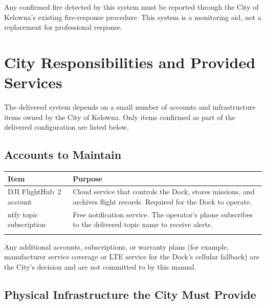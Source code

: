 \documentclass[11pt,letterpaper]{article}
\begin{document}
\begin{infobox}
Any confirmed fire detected by this system must be reported through the
City of Kelowna's existing fire-response procedure. This system is a
monitoring aid, not a replacement for professional response.
\end{infobox}

\newpage


\section{City Responsibilities and Provided Services}

The delivered system depends on a small number of accounts and
infrastructure items owned by the City of Kelowna. Only items confirmed
as part of the delivered configuration are listed below.

\subsection{Accounts to Maintain}

\begin{longtable}{@{}p{4.0cm}p{11.0cm}@{}}
\toprule
\textbf{Item} & \textbf{Purpose} \\
\midrule
DJI FlightHub~2 account & Cloud service that controls the Dock, stores missions, and archives flight records. Required for the Dock to operate. \\
\addlinespace
ntfy topic subscription & Free notification service. The operator's phone subscribes to the delivered topic name to receive alerts. \\
\addlinespace
\bottomrule
\end{longtable}

Any additional accounts, subscriptions, or warranty plans (for example,
manufacturer service coverage or LTE service for the Dock's cellular
fallback) are the City's decision and are not committed to by this
manual.

\subsection{Physical Infrastructure the City Must Provide}
\end{document}

